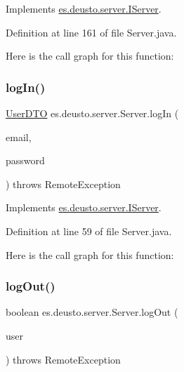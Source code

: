 Implements \mbox{\hyperlink{interfacees_1_1deusto_1_1server_1_1_i_server_a2dcd7f0b0e157eb797e20432c0b0e971}{es.\+deusto.\+server.\+I\+Server}}.



Definition at line 161 of file Server.\+java.

Here is the call graph for this function\+:
\mbox{\label{classes_1_1deusto_1_1server_1_1_server_ab93f5cc9b5825192c31cd2088014378d}} 
\subsubsection{\texorpdfstring{logIn()}{logIn()}}
{\footnotesize\ttfamily \mbox{\hyperlink{classes_1_1deusto_1_1server_1_1data_1_1_user_d_t_o}{User\+D\+TO}} es.\+deusto.\+server.\+Server.\+log\+In (\begin{DoxyParamCaption}\item[{String}]{email,  }\item[{String}]{password }\end{DoxyParamCaption}) throws Remote\+Exception}



Implements \mbox{\hyperlink{interfacees_1_1deusto_1_1server_1_1_i_server_a62db155ac744b9712e303ceea76a3560}{es.\+deusto.\+server.\+I\+Server}}.



Definition at line 59 of file Server.\+java.

Here is the call graph for this function\+:
\mbox{\label{classes_1_1deusto_1_1server_1_1_server_a92cf8a599adfa6a34f7cfe788119cf0a}} 
\subsubsection{\texorpdfstring{logOut()}{logOut()}}
{\footnotesize\ttfamily boolean es.\+deusto.\+server.\+Server.\+log\+Out (\begin{DoxyParamCaption}\item[{\mbox{\hyperlink{classes_1_1deusto_1_1server_1_1data_1_1_user_d_t_o}{User\+D\+TO}}}]{user }\end{DoxyParamCaption}) throws Remote\+Exception}



